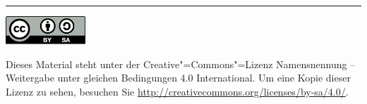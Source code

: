 
\thispagestyle{empty}
\par\vspace*{\fill}

\noindent\rule{\textwidth}{1pt}

\vspace*{0.3cm}
\noindent\includegraphics[width=3cm]{imports/by-sa.pdf}
\vspace*{-0.3cm}
\hspace*{0.5cm}
\parbox{9cm}{ \sffamily
Dieses Material steht unter der Creative"=Commons"=Lizenz Namensnennung -- Weitergabe unter gleichen Bedingungen 4.0 International. Um eine Kopie dieser Lizenz zu sehen, besuchen Sie \url{http://creativecommons.org/licenses/by-sa/4.0/}.}
\vspace{0.3cm}
